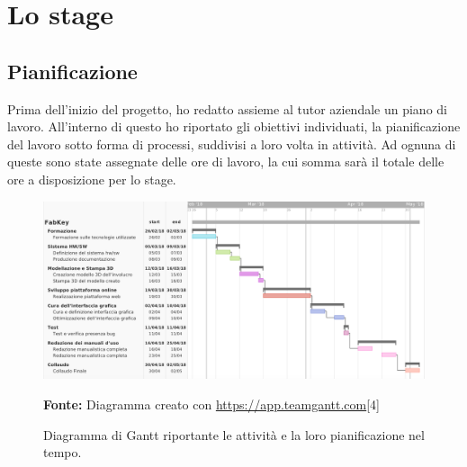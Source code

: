 
\chapter{Lo stage}
\label{cap:descrizione-stage}

\section{Pianificazione}
Prima dell'inizio del progetto, ho redatto assieme al tutor aziendale un piano di lavoro. All'interno di questo ho riportato gli obiettivi individuati, la pianificazione del lavoro sotto forma di processi, suddivisi a loro volta in attività. Ad ognuna di queste sono state assegnate delle ore di lavoro, la cui somma sarà il totale delle ore a disposizione per lo stage.

\bigskip

\begin{figure}[H]
	\begin{center}
	\includegraphics[scale=0.35]{immagini/gantt_best.png}
	\caption{Diagramma di Gantt riportante le attività e la loro pianificazione nel tempo.}
	\small{\textbf{Fonte:} Diagramma creato con \url{https://app.teamgantt.com}[4]}
	\end{center}
\end{figure}

